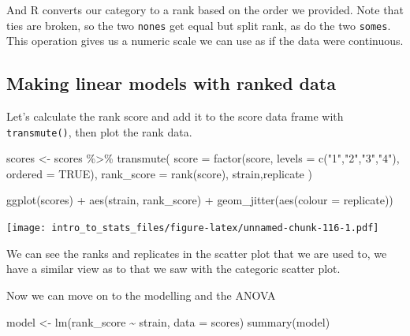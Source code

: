 \documentclass[
]{book}
\newenvironment{Shaded}{\begin{snugshade}}{\end{snugshade}}
\newcommand{\AttributeTok}[1]{\textcolor[rgb]{0.77,0.63,0.00}{#1}}
\newcommand{\ConstantTok}[1]{\textcolor[rgb]{0.00,0.00,0.00}{#1}}
\newcommand{\FunctionTok}[1]{\textcolor[rgb]{0.00,0.00,0.00}{#1}}
\newcommand{\NormalTok}[1]{#1}
\newcommand{\OtherTok}[1]{\textcolor[rgb]{0.56,0.35,0.01}{#1}}
\newcommand{\SpecialCharTok}[1]{\textcolor[rgb]{0.00,0.00,0.00}{#1}}
\newcommand{\StringTok}[1]{\textcolor[rgb]{0.31,0.60,0.02}{#1}}
\begin{document}
And R converts our category to a rank based on the order we provided. Note that ties are broken, so the two \texttt{nones} get equal but split rank, as do the two \texttt{somes}. This operation gives us a numeric scale we can use as if the data were continuous.

\hypertarget{making-linear-models-with-ranked-data}{%
\subsection{Making linear models with ranked data}\label{making-linear-models-with-ranked-data}}

Let's calculate the rank score and add it to the score data frame with \texttt{transmute()}, then plot the rank data.

\begin{Shaded}
\begin{Highlighting}[]
\NormalTok{scores }\OtherTok{\textless{}{-}}\NormalTok{ scores }\SpecialCharTok{\%\textgreater{}\%} \FunctionTok{transmute}\NormalTok{(}
  \AttributeTok{score =} \FunctionTok{factor}\NormalTok{(score, }\AttributeTok{levels =} \FunctionTok{c}\NormalTok{(}\StringTok{"1"}\NormalTok{,}\StringTok{"2"}\NormalTok{,}\StringTok{"3"}\NormalTok{,}\StringTok{"4"}\NormalTok{), }\AttributeTok{ordered =} \ConstantTok{TRUE}\NormalTok{),}
  \AttributeTok{rank\_score =} \FunctionTok{rank}\NormalTok{(score),}
\NormalTok{  strain,replicate}
\NormalTok{)}

\FunctionTok{ggplot}\NormalTok{(scores) }\SpecialCharTok{+} \FunctionTok{aes}\NormalTok{(strain, rank\_score) }\SpecialCharTok{+} \FunctionTok{geom\_jitter}\NormalTok{(}\FunctionTok{aes}\NormalTok{(}\AttributeTok{colour =}\NormalTok{ replicate))}
\end{Highlighting}
\end{Shaded}

\texttt{[image: intro\_to\_stats\_files/figure-latex/unnamed-chunk-116-1.pdf]}

We can see the ranks and replicates in the scatter plot that we are used to, we have a similar view as to that we saw with the categoric scatter plot.

Now we can move on to the modelling and the ANOVA

\begin{Shaded}
\begin{Highlighting}[]
\NormalTok{model }\OtherTok{\textless{}{-}} \FunctionTok{lm}\NormalTok{(rank\_score }\SpecialCharTok{\textasciitilde{}}\NormalTok{ strain, }\AttributeTok{data =}\NormalTok{ scores)}
\FunctionTok{summary}\NormalTok{(model)}
\end{Highlighting}
\end{Shaded}
\end{document}
